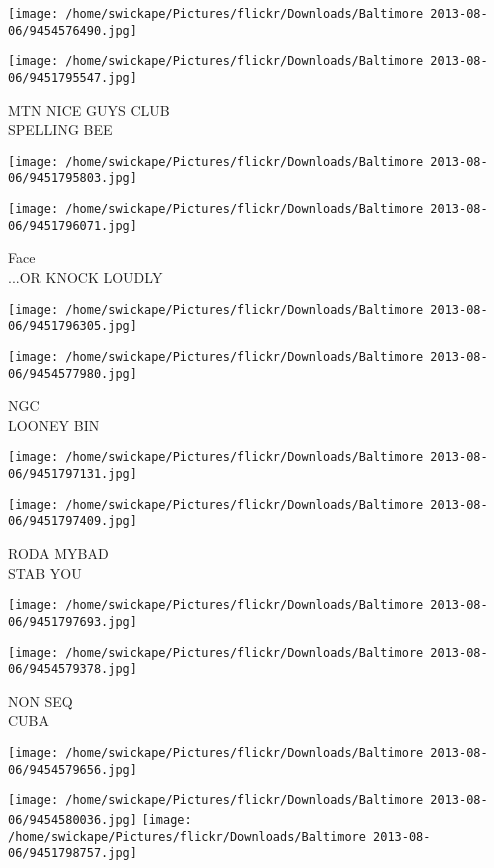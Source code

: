 \documentclass[10pt,letterpaper]{article}
\begin{document}
\texttt{[image: /home/swickape/Pictures/flickr/Downloads/Baltimore 2013-08-06/9454576490.jpg]}

\vspace{0.25in}
\texttt{[image: /home/swickape/Pictures/flickr/Downloads/Baltimore 2013-08-06/9451795547.jpg]}

MTN NICE GUYS CLUB\\
SPELLING BEE
\pagebreak

\texttt{[image: /home/swickape/Pictures/flickr/Downloads/Baltimore 2013-08-06/9451795803.jpg]}

\vspace{0.25in}
\texttt{[image: /home/swickape/Pictures/flickr/Downloads/Baltimore 2013-08-06/9451796071.jpg]}

Face\\
...OR KNOCK LOUDLY
\pagebreak

\texttt{[image: /home/swickape/Pictures/flickr/Downloads/Baltimore 2013-08-06/9451796305.jpg]}

\vspace{0.25in}
\texttt{[image: /home/swickape/Pictures/flickr/Downloads/Baltimore 2013-08-06/9454577980.jpg]}

NGC\\
LOONEY BIN
\pagebreak

\texttt{[image: /home/swickape/Pictures/flickr/Downloads/Baltimore 2013-08-06/9451797131.jpg]}

\vspace{0.25in}
\texttt{[image: /home/swickape/Pictures/flickr/Downloads/Baltimore 2013-08-06/9451797409.jpg]}

RODA MYBAD\\
STAB YOU
\pagebreak

\texttt{[image: /home/swickape/Pictures/flickr/Downloads/Baltimore 2013-08-06/9451797693.jpg]}

\vspace{0.25in}
\texttt{[image: /home/swickape/Pictures/flickr/Downloads/Baltimore 2013-08-06/9454579378.jpg]}

NON SEQ\\
CUBA
\pagebreak

\texttt{[image: /home/swickape/Pictures/flickr/Downloads/Baltimore 2013-08-06/9454579656.jpg]}

\vspace{0.25in}
\texttt{[image: /home/swickape/Pictures/flickr/Downloads/Baltimore 2013-08-06/9454580036.jpg]}
\texttt{[image: /home/swickape/Pictures/flickr/Downloads/Baltimore 2013-08-06/9451798757.jpg]}
\end{document}
